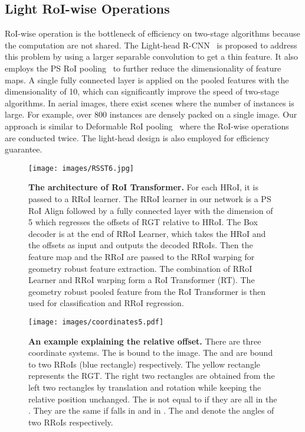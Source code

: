 \documentclass[11pt,onecolumn]{article}         \usepackage[top=3.6cm, bottom=3.2cm, left=2.3cm, right=2.3cm]{geometry}
\begin{document}
\subsection{Light RoI-wise Operations}
RoI-wise operation is the bottleneck of efficiency on two-stage algorithms because the computation are not shared. The Light-head R-CNN~\cite{light_head} is proposed to address this problem by using a larger separable convolution to get a thin feature. It also employs the PS RoI pooling~\cite{R-FCN} to further reduce the dimensionality of feature maps. A single fully connected layer is applied on the pooled features with the dimensionality of 10, which can significantly improve the speed of two-stage algorithms. In aerial images, there exist scenes where the number of instances is large. For example, over 800 instances are densely packed on a single  image. Our approach is similar to Deformable RoI pooling~\cite{Deformable} where the RoI-wise operations are conducted twice. The light-head design is also employed for efficiency guarantee. 


 \begin{figure}[t!]
    \centering
    \texttt{[image: images/RSST6.jpg]}
\caption{{\bf The architecture of RoI Transformer.} For each HRoI, it is passed to a RRoI learner. The RRoI learner in our network is a PS RoI Align followed by a fully connected layer with the dimension of 5 which regresses the offsets of RGT relative to HRoI. The Box decoder is at the end of RRoI Learner, which takes the HRoI and the offsets as input and outputs the decoded RRoIs. Then the feature map and the RRoI are passed to the RRoI warping for geometry robust feature extraction. The combination of RRoI Learner and RRoI warping form a RoI Transformer (RT). The geometry robust pooled feature from the RoI Transformer is then used for classification and RRoI regression.
    }
    \label{fig:cascadepipeline}
    \vspace{1mm}
\end{figure}
\begin{figure}[t!]
    \centering
    \texttt{[image: images/coordinates5.pdf]}
    \caption{{\bf An example explaining the relative offset.} There are three coordinate systems. The  is bound to the image. The  and  are bound to two RRoIs (blue rectangle) respectively. The yellow rectangle represents the RGT. The right two rectangles are obtained from the left two rectangles by translation and rotation while keeping the relative position unchanged.
    The  is not equal to  if they are all in the . They are the same if  falls in  and  in . The  and  denote the angles of two RRoIs respectively.
    }
    \label{fig:coordinates}
    \vspace{1mm}
\end{figure}
\end{document}
